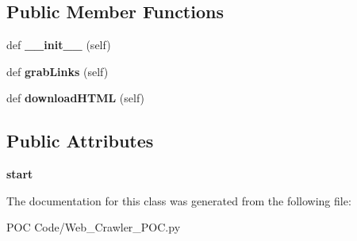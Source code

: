 \subsection*{Public Member Functions}
\begin{DoxyCompactItemize}
\item 
def {\bfseries \+\_\+\+\_\+init\+\_\+\+\_\+} (self)\hypertarget{class_web___crawler___p_o_c_1_1_web___crawler___p_o_c_a232eab61453fcf69417a28bae300d455}{}\label{class_web___crawler___p_o_c_1_1_web___crawler___p_o_c_a232eab61453fcf69417a28bae300d455}

\item 
def {\bfseries grab\+Links} (self)\hypertarget{class_web___crawler___p_o_c_1_1_web___crawler___p_o_c_afefd3071c3d330773bc1cadca2b58801}{}\label{class_web___crawler___p_o_c_1_1_web___crawler___p_o_c_afefd3071c3d330773bc1cadca2b58801}

\item 
def {\bfseries download\+H\+T\+ML} (self)\hypertarget{class_web___crawler___p_o_c_1_1_web___crawler___p_o_c_aa68f01d7c03def373ae2389757c1de89}{}\label{class_web___crawler___p_o_c_1_1_web___crawler___p_o_c_aa68f01d7c03def373ae2389757c1de89}

\end{DoxyCompactItemize}
\subsection*{Public Attributes}
\begin{DoxyCompactItemize}
\item 
{\bfseries start}\hypertarget{class_web___crawler___p_o_c_1_1_web___crawler___p_o_c_a5a87a2533b8d08083270432c3ff658a9}{}\label{class_web___crawler___p_o_c_1_1_web___crawler___p_o_c_a5a87a2533b8d08083270432c3ff658a9}

\end{DoxyCompactItemize}


The documentation for this class was generated from the following file\+:\begin{DoxyCompactItemize}
\item 
P\+O\+C Code/Web\+\_\+\+Crawler\+\_\+\+P\+O\+C.\+py\end{DoxyCompactItemize}
